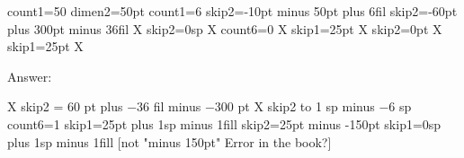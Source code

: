 \obeylines
count1=50
dimen2=50pt
count1=6
skip2=-10pt minus 50pt plus 6fil
skip2=-60pt plus 300pt minus 36fil X
skip2=0sp X
count6=0 X
skip1=25pt X
skip2=0pt X
skip1=25pt X

Answer:

X skip2 = 60 pt plus −36 fil minus −300 pt
X skip2 to 1 sp minus −6 sp
count6=1
skip1=25pt plus 1sp minus 1fill
skip2=25pt minus -150pt
skip1=0sp plus 1sp minus 1fill [not "minus 150pt" Error in the book?]



\bye
